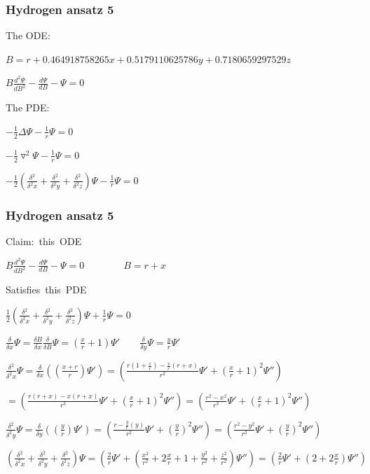 \documentclass{beamer}
\begin{document}
\begin{frame}[fragile]
\frametitle{Hydrogen ansatz 5}

The ODE:
\vskip 20pt
\centerline{$B = r + 0.464918758265 x + 0.5179110625786 y + 0.7180659297529 z$}
\vskip 20pt
\centerline{$B \frac{d^2\Psi}{dB^2} - \frac{d\Psi}{dB} - \Psi = 0$}
\vskip 20pt

The PDE:

\vskip 20pt

\centerline{$-\frac{1}{2} \Delta \Psi - \frac{1}{r}\Psi = 0$}
\vskip 20pt
\centerline{$-\frac{1}{2} \triangledown^2 \Psi - \frac{1}{r}\Psi = 0$}
\vskip 20pt

\centerline{$-\frac{1}{2} \left(\frac{\delta^2}{\delta^2 x} + \frac{\delta^2}{\delta^2 y} + \frac{\delta^2}{\delta^2 z}\right) \Psi - \frac{1}{r}\Psi = 0$}



\end{frame}

\begin{frame}[fragile]
\frametitle{Hydrogen ansatz 5}
\scriptsize

\hbox{Claim: this ODE}\centerline{$B \frac{d^2\Psi}{dB^2} - \frac{d\Psi}{dB} - \Psi = 0 \qquad\qquad B = r + x$}
\vskip 20pt

\hbox{Satisfies this PDE}\centerline{$\frac{1}{2} \left(\frac{\delta^2}{\delta^2 x} + \frac{\delta^2}{\delta^2 y} + \frac{\delta^2}{\delta^2 z}\right) \Psi + \frac{1}{r}\Psi = 0$}

\vskip 20pt

\centerline{$\frac{\delta}{\delta x} \Psi = \frac{\delta B}{\delta x} \frac{\delta}{\delta B}  \Psi = \left(\frac{x}{r} + 1\right)\Psi' \qquad \frac{\delta}{\delta y} \Psi = \frac{y}{r} \Psi' $}

\vskip 20pt

\centerline{$\frac{\delta^2}{\delta^2 x} \Psi = \frac{\delta}{\delta x} \left(\left(\frac{x + r}{r}\right) \Psi'\right) = \left(\frac{r(1 + \frac{x}{r}) - \frac{x}{r}(r+x)}{r^2} \Psi' + \left(\frac{x}{r} + 1\right)^2\Psi''\right)$}
\centerline{$= \left(\frac{r(r + x) - x(r+x)}{r^3} \Psi' + \left(\frac{x}{r} + 1\right)^2\Psi''\right) = \left(\frac{r^2 - x^2}{r^3} \Psi' + \left(\frac{x}{r} + 1\right)^2\Psi''\right)$}

\vskip 20pt

\centerline{$\frac{\delta^2}{\delta^2 y} \Psi = \frac{\delta}{\delta y} \left(\left(\frac{y}{r}\right) \Psi'\right) = \left(\frac{r - \frac{y}{r}(y)}{r^2} \Psi' + \left(\frac{y}{r}\right)^2\Psi''\right) = \left(\frac{r^2 - y^2}{r^3} \Psi' + \left(\frac{y}{r}\right)^2\Psi''\right)$}

\vskip 20pt

\centerline{$\left(\frac{\delta^2}{\delta^2 x} + \frac{\delta^2}{\delta^2 y} + \frac{\delta^2}{\delta^2 z}\right) \Psi = \left(\frac{2}{r}\Psi' + \left(\frac{x^2}{r^2} + 2\frac{x}{r} + 1 + \frac{y^2}{r^2} + \frac{z^2}{r^2}\right)\Psi''\right)  = \left(\frac{2}{r}\Psi' + \left(2 + 2\frac{x}{r}\right)\Psi''\right)$}

\end{frame}
\end{document}

